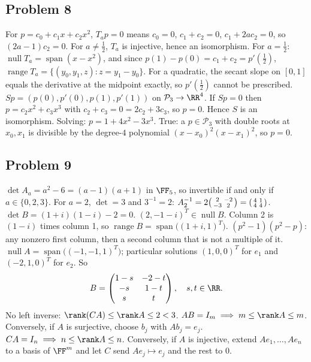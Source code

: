 \documentclass[11pt]{scrartcl}
\DeclareMathOperator{\nul}{null}
\DeclareMathOperator{\range}{range}
\DeclareMathOperator{\spn}{span}
\newcommand{\PP}{\mathcal P}
\begin{document}
\subsection*{Problem 8}
\begin{enumerate}[(a)]
  \ii For $p=c_0+c_1x+c_2x^2$, $T_ap=0$ means $c_0=0$, $c_1+c_2=0$, $c_1+2ac_2=0$, so $(2a-1)c_2=0$.
  For $a\ne\tfrac12$, $T_a$ is injective, hence an isomorphism.
  For $a=\tfrac12$: $\nul T_a=\spn(x-x^2)$, and since $p(1)-p(0)=c_1+c_2=p'(\tfrac12)$,
  $\range T_a=\{(y_0,y_1,z):z=y_1-y_0\}$.
  For a quadratic, the secant slope on $[0,1]$ equals the derivative at the midpoint exactly, so $p'(\tfrac12)$ cannot be prescribed.
  \ii $Sp=(p(0),p'(0),p(1),p'(1))$ on $\PP_3\to\RR^4$.
  If $Sp=0$ then $p=c_2x^2+c_3x^3$ with $c_2+c_3=0=2c_2+3c_3$, so $p=0$.
  Hence $S$ is an isomorphism.
  Solving: $p=1+4x^2-3x^3$.
  \ii True: a $p\in\PP_3$ with double roots at $x_0,x_1$ is divisible by the degree-$4$ polynomial $(x-x_0)^2(x-x_1)^2$, so $p=0$.
\end{enumerate}

\subsection*{Problem 9}
\begin{enumerate}[(a)]
  \ii $\det A_a=a^2-6=(a-1)(a+1)$ in $\FF_5$, so invertible if and only if $a\in\{0,2,3\}$.
  For $a=2$, $\det=3$ and $3^{-1}=2$:
  $A_2^{-1}=2\begin{psmallmatrix}2&-2\\-3&2\end{psmallmatrix}=\begin{psmallmatrix}4&1\\4&4\end{psmallmatrix}$.
  \ii $\det B=(1+i)(1-i)-2=0$.
  $(2,-1-i)^T\in\nul B$.
  Column 2 is $(1-i)$ times column 1, so $\range B=\spn\big((1+i,1)^T\big)$.
  \ii $(p^2-1)(p^2-p)$: any nonzero first column, then a second column that is not a multiple of it.
  \ii $\nul A=\spn\big((-1,-1,1)^T\big)$; particular solutions $(1,0,0)^T$ for $e_1$ and $(-2,1,0)^T$ for $e_2$. So
  \[ B=\begin{pmatrix}1-s&-2-t\\-s&1-t\\s&t\end{pmatrix},\quad s,t\in\RR. \]
  No left inverse: $\rank(CA)\le\rank A\le2<3$.
  \ii $AB=I_m\implies m\le\rank A\le m$.
  Conversely, if $A$ is surjective, choose $b_j$ with $Ab_j=e_j$.
  $CA=I_n\implies n\le\rank A\le n$.
  Conversely, if $A$ is injective, extend $Ae_1,\dots,Ae_n$ to a basis of $\FF^m$ and let $C$ send $Ae_j\mapsto e_j$ and the rest to $0$.
\end{enumerate}
\end{document}
